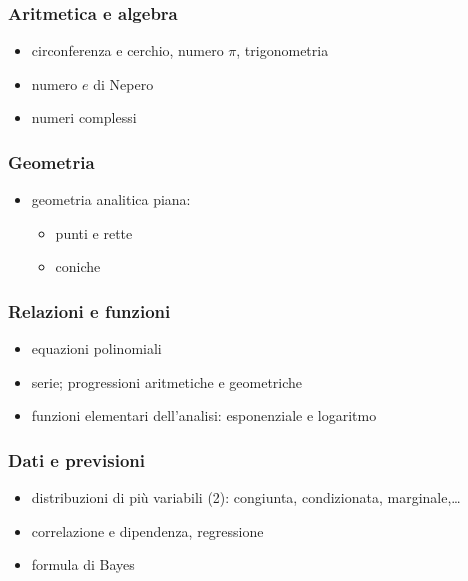 \documentclass[letterpaper,10pt,italian]{jupyterBook}
\begin{document}
\subsubsection*{Aritmetica e algebra}
\begin{itemize}
\item {} 
\sphinxAtStartPar
circonferenza e cerchio, numero \(\pi\), trigonometria

\item {} 
\sphinxAtStartPar
numero \(e\) di Nepero

\item {} 
\sphinxAtStartPar
numeri complessi

\end{itemize}
\subsubsection*{Geometria}
\begin{itemize}
\item {} 
\sphinxAtStartPar
geometria analitica piana:
\begin{itemize}
\item {} 
\sphinxAtStartPar
punti e rette

\item {} 
\sphinxAtStartPar
coniche  

\end{itemize}

\end{itemize}
\subsubsection*{Relazioni e funzioni}
\begin{itemize}
\item {} 
\sphinxAtStartPar
equazioni polinomiali

\item {} 
\sphinxAtStartPar
serie; progressioni aritmetiche e geometriche

\item {} 
\sphinxAtStartPar
funzioni elementari dell’analisi: esponenziale e logaritmo

\end{itemize}
\subsubsection*{Dati e previsioni}
\begin{itemize}
\item {} 
\sphinxAtStartPar
distribuzioni di più variabili (2): congiunta, condizionata, marginale,…

\item {} 
\sphinxAtStartPar
correlazione e dipendenza, regressione

\item {} 
\sphinxAtStartPar
formula di Bayes

\end{itemize}
\end{document}
